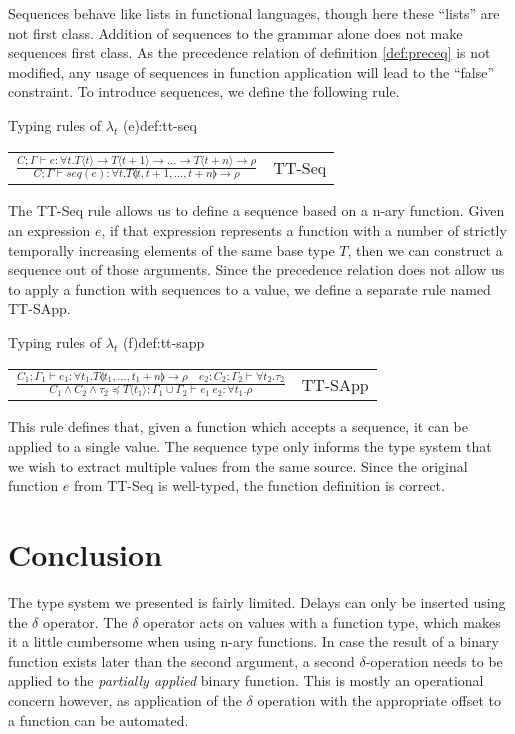 Sequences behave like lists in functional languages, though here these ``lists'' are not first class.
Addition of sequences to the grammar alone does not make sequences first class. 
As the precedence relation of definition \ref{def:preceq} is not modified, any usage of sequences in function application will lead to the ``false'' constraint.
To introduce sequences, we define the following rule.

\begin{definitiontitled}{Typing rules of $\lambda_t$ (e)}{def:tt-seq}
\centering
\begin{tabular}{l l}
$ \displaystyle
  \frac{  C; \Gamma \vdash e : \forall t. T\langle t \rangle \to T \langle t+1 \rangle \to \ldots \to T \langle t+n \rangle \to \rho 
  } {     C; \Gamma \vdash seq(e) : \forall t. T\llangle t,t+1,\ldots,t+n\rrangle \to \rho } 
$ 
& TT-Seq \\
\end{tabular} 
\end{definitiontitled}
The TT-Seq rule allows us to define a sequence based on a n-ary function.
Given an expression $e$, if that expression represents a function with a number of strictly temporally increasing elements of the same base type $T$, then we can construct a sequence out of those arguments.
Since the precedence relation does not allow us to apply a function with sequences to a value, we define a separate rule named TT-SApp.

\begin{definitiontitled}{Typing rules of $\lambda_t$ (f)}{def:tt-sapp}
\centering
\begin{tabular}{l l}
$ \displaystyle
  \frac{  C_1; \Gamma_1 \vdash e_1 : \forall t_1. T \llangle t_1,\ldots,t_1+n\rrangle \to \rho \quad e_2 : C_2; \Gamma_2 \vdash \forall t_2. \tau_2
  } {     C_1 \land C_2 \land \tau_2 \preceq T\langle t_1 \rangle; \Gamma_1 \cup \Gamma_2 \vdash e_1 \: e_2 : \forall t_1. \rho }
$ 
& TT-SApp \\
\end{tabular} 
\end{definitiontitled}

This rule defines that, given a function which accepts a sequence, it can be applied to a single value.
The sequence type only informs the type system that we wish to extract multiple values from the same source.
Since the original function $e$ from TT-Seq is well-typed, the function definition is correct.

\section{Conclusion}
The type system we presented is fairly limited.
Delays can only be inserted using the $\delta$ operator.
The $\delta$ operator acts on values with a function type, which makes it a little cumbersome when using n-ary functions.
In case the result of a binary function exists later than the second argument, a second $\delta$-operation needs to be applied to the \textit{partially applied} binary function.
This is mostly an operational concern however, as application of the $\delta$ operation with the appropriate offset to a function can be automated.

